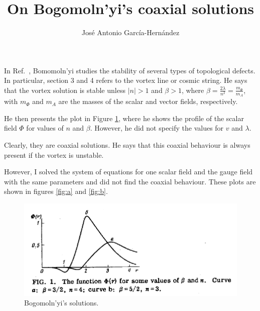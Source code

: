 \documentclass[12pt,a4paper]{article}
\author{José Antonio García-Hernández}
\title{On Bogomoln'yi's coaxial solutions}
\begin{document}
\maketitle

In Ref.\ \cite{bogo1975}, Bomomoln'yi studies the stability of several types of topological defects. In particular, section 3 and 4 refers to the vortex line or cosmic string. He says that the vortex solution is stable unless $|n|>1$ and $\beta>1$, where $\beta = \frac{2\lambda}{n^2} = \frac{m_{\Phi}}{m_A}$, with $m_{\Phi}$ and $m_A$ are the masses of the scalar and vector fields, respectively.

He then presents the plot in Figure \ref{fig:bogo}, where he shows the profile of the scalar field $\Phi$ for values of $n$ and $\beta$. However, he did not specify the values for $v$ and $\lambda$. 

Clearly, they are coaxial solutions. He says that this coaxial behaviour is always present if the vortex is unstable. 

However, I solved the system of equations for one scalar field and the gauge field with the same parameters and did not find the coaxial behaviour. These plots are shown in figures \ref{fig:a} and \ref{fig:b}.





\begin{figure}
\includegraphics[scale=0.5]{bogo.png}
\caption{Bogomoln'yi's solutions.}
\label{fig:bogo}
\end{figure}
\end{document}

